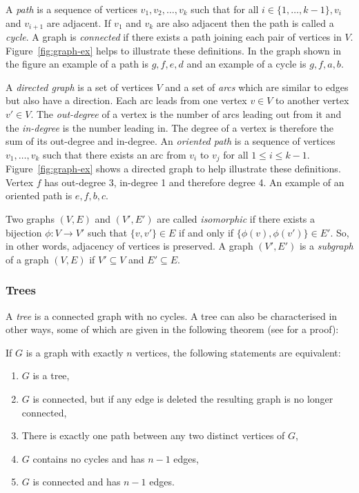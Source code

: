 A \textit{path} is a sequence of vertices $v_1,v_2,\dotsc,v_k$ such that for
all $i \in \{1,\dotsc,k-1\}, v_i$ and $v_{i+1}$ are adjacent.  If $v_1$ and
$v_k$ are also adjacent then the path is called a \textit{cycle}.  A graph is
\textit{connected} if there exists a path joining each pair of vertices in
$V$.  Figure~\ref{fig:graph-ex} helps to illustrate these definitions.  In the
graph shown in the figure an example of a path is $g,f,e,d$ and an example of
a cycle is $g,f,a,b$.

A \textit{directed graph} is a set of vertices $V$ and a set of \textit{arcs}
which are similar to edges but also have a direction.  Each arc leads from one
vertex $v \in V$ to another vertex $v' \in V$.  The \textit{out-degree} of a
vertex is the number of arcs leading out from it and the \textit{in-degree} is
the number leading in.  The degree of a vertex is therefore the sum of its
out-degree and in-degree.  An \textit{oriented path} is a sequence of vertices
$v_1,\dotsc,v_k$ such that there exists an arc from $v_i$ to $v_j$ for all $1
\leq i \leq k-1$.  Figure~\ref{fig:graph-ex} shows a directed graph to help
illustrate these definitions.  Vertex $f$ has out-degree 3, in-degree 1 and
therefore degree 4.  An example of an oriented path is $e,f,b,c$.

Two graphs $(V,E)$ and $(V',E')$ are called \textit{isomorphic} if there
exists a bijection $\phi \colon V \to V'$ such that $\{v,v'\} \in E$ if and
only if $\{\phi(v),\phi(v')\} \in E'$.  So, in other words, adjacency of
vertices is preserved.  A graph $(V',E')$ is a \textit{subgraph} of a graph
$(V,E)$ if $V' \subseteq V$ and $E' \subseteq E$.

\subsubsection{Trees}
\label{sec:trees}

A \textit{tree} is a connected graph with no cycles.  A tree can also be
characterised in other ways, some of which are given in the following theorem
(see \citep[][section 2.3.4.1]{knuth97taocp1} for a proof):

\begin{thm}
  If $G$ is a graph with exactly $n$ vertices, the following statements are
  equivalent:
  \begin{enumerate}[label=\alph*)]
  \item $G$ is a tree,
  \item $G$ is connected, but if any edge is deleted the resulting graph is no
    longer connected,
  \item There is exactly one path between any two distinct vertices of $G$,
  \item $G$ contains no cycles and has $n-1$ edges,
  \item $G$ is connected and has $n-1$ edges.
  \end{enumerate}
\end{thm}


